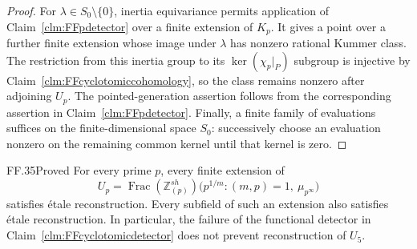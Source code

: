\begin{proof}
For \(\lambda\in S_0\setminus\{0\}\), inertia
equivariance permits application of
Claim~\ref{clm:FFpdetector} over a finite extension
of \(K_p\). It gives a point over a further
finite extension whose image under \(\lambda\)
has nonzero rational Kummer class. The restriction
from this inertia group to its
\(\ker(\chi_p|_P)\) subgroup is injective by
Claim~\ref{clm:FFcyclotomiccohomology}, so the
class remains nonzero after adjoining \(U_p\).
The pointed-generation assertion follows from
the corresponding assertion in
Claim~\ref{clm:FFpdetector}. Finally, a finite
family of evaluations suffices on the
finite-dimensional space \(S_0\): successively
choose an evaluation nonzero on the remaining
common kernel until that kernel is zero.
\end{proof}

\begin{claim}{FF.35}{Proved}\label{clm:FFcyclotomicreconstruct}
For every prime \(p\), every finite extension of
\[
 U_p=\operatorname{Frac}(\mathbb Z_{(p)}^{sh})
       \bigl(p^{1/m}:(m,p)=1,\ \mu_{p^\infty}\bigr)
                                                        \tag{FF.35.1}
\]
satisfies \'etale reconstruction. Every subfield of
such an extension also satisfies \'etale reconstruction.
In particular, the failure of the functional detector
in Claim~\ref{clm:FFcyclotomicdetector} does not prevent
reconstruction of \(U_5\).
\end{claim}
